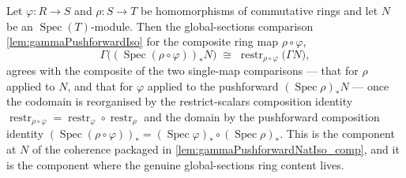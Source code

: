 \begin{lemma}


  \label{lem:gammaPushforwardIso_comp}
  Let \(\varphi : R \to S\) and \(\rho : S \to T\) be homomorphisms of commutative
  rings and let \(N\) be an \(\operatorname{Spec}(T)\)-module. Then the global-sections
  comparison \cref{lem:gammaPushforwardIso} for the composite ring map
  \(\rho\circ\varphi\),
  \[
    \Gamma\bigl((\operatorname{Spec}(\rho\circ\varphi))_* N\bigr)
      \;\cong\;
    \operatorname{restr}_{\rho\circ\varphi}\bigl(\Gamma N\bigr),
  \]
  agrees with the composite of the two single-map comparisons — that for \(\rho\)
  applied to \(N\), and that for \(\varphi\) applied to the pushforward
  \((\operatorname{Spec}\rho)_* N\) — once the codomain is reorganised by the
  restrict-scalars composition identity
  \(\operatorname{restr}_{\rho\circ\varphi} = \operatorname{restr}_\varphi \circ
  \operatorname{restr}_\rho\) and the domain by the pushforward composition identity
  \((\operatorname{Spec}(\rho\circ\varphi))_* = (\operatorname{Spec}\varphi)_* \circ
  (\operatorname{Spec}\rho)_*\). This is the component at \(N\) of the coherence
  packaged in \cref{lem:gammaPushforwardNatIso_comp}, and it is the component where the
  genuine global-sections ring content lives.
\end{lemma}

